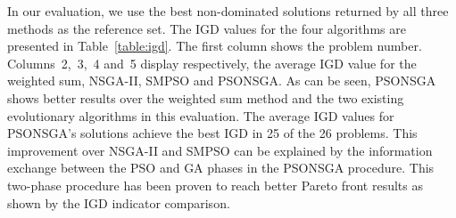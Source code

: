 \documentclass[10pt,journal,compsoc]{IEEEtran}
\begin{document}

In our evaluation, we use the best non-dominated solutions returned by all three methods as the reference set. The IGD values for the four algorithms are presented in Table~\ref{table:igd}. The first column shows the problem number. Columns~2,~3,~4 and~5 display respectively, the average IGD value for the weighted sum, NSGA-II, SMPSO and PSONSGA. As can be seen, PSONSGA shows better results over the weighted sum method and the two existing evolutionary algorithms in this evaluation. The average IGD values for PSONSGA's solutions achieve the best IGD in 25 of the 26 problems. This improvement over NSGA-II and SMPSO can be explained by the information exchange between the PSO and GA phases in the PSONSGA procedure. This two-phase procedure has been proven to reach better Pareto front results as shown by the IGD indicator comparison.
\end{document}
